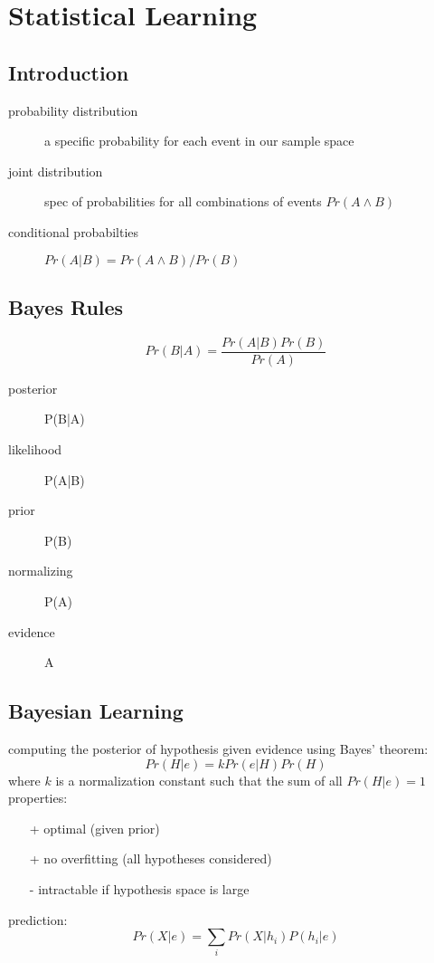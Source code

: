 \documentclass[]{article}
\theoremstyle{definition}
\begin{document}
    \section{Statistical Learning}
    \label{sec:statistical_learning}

    \subsection{Introduction}

    \begin{description}
        \item[probability distribution] a specific probability for each event in our sample space
        \item[joint distribution] spec of probabilities for all combinations of events $Pr(A \wedge B)$
        \item[conditional probabilties] $Pr(A|B) = Pr(A \wedge B) / Pr(B)$
    \end{description}

    \subsection{Bayes Rules}
    \label{sub:bayes_ruless}

    \begin{equation*}
        Pr(B|A) = \frac{Pr(A|B)Pr(B)}{Pr(A)}
    \end{equation*}
    \begin{description}
        \item[posterior] P(B|A)
        \item[likelihood] P(A|B)
        \item[prior] P(B)
        \item[normalizing] P(A)
        \item[evidence] A
    \end{description}

    \subsection{Bayesian Learning}
    \label{sub:bayesian_learning}

    computing the posterior of hypothesis given evidence using Bayes' theorem:
    \begin{equation*}
        Pr(H|e) = k Pr(e|H) Pr(H)
    \end{equation*}
    where $k$ is a normalization constant such that the sum of all $Pr(H | e) = 1$ \\
    properties:
    \begin{itemize}
        \item[+] optimal (given prior)
        \item[+] no overfitting (all hypotheses considered)
        \item[-] intractable if hypothesis space is large
    \end{itemize}
    prediction:
    \begin{equation*}
        Pr(X|e) = \sum_i Pr(X|h_i) P(h_i|e)
    \end{equation*}
\end{document}
